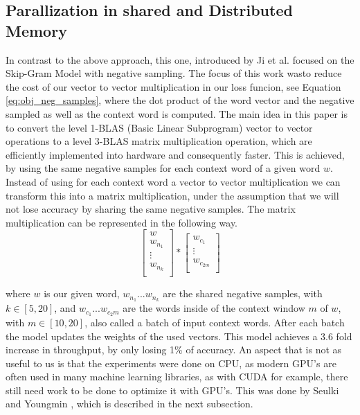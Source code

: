 \subsection{Parallization in shared and Distributed Memory}
In contrast to the above approach, this one, introduced by Ji et al. \cite{intel} focused on the Skip-Gram Model with negative sampling. The focus of this work wasto reduce the cost of our vector to  vector multiplication in our loss funcion, see Equation \ref{eq:obj_neg_samples}, where the dot product of the word vector and the negative sampled as well as the context word is computed.
The main idea in this paper is to convert the level 1-BLAS (Basic Linear Subprogram) vector to vector operations to a level 3-BLAS matrix multiplication operation, which are efficiently implemented into hardware and consequently faster. This is achieved, by using the same negative samples for each context word of a given word $w$. Instead of using for each context word a vector to vector multiplication we can transform this into a matrix multiplication, under the assumption that we will not lose accuracy by sharing the same negative samples. The matrix multiplication can be represented in the following way.
\[
\begin{bmatrix}
w \\
w_{n_1} \\
\vdots \\
w_{n_k}\\
\end{bmatrix}
*
\begin{bmatrix}
w_{c_1}\\
\vdots\\
w_{c_{2m}}\\
\end{bmatrix}
\]

where $w$ is our given word, $w_{n_1}...w_{n_k}$ are the shared negative samples, with $k \in [5,20]$, and $w_{c_1}...w_{c_2m}$ are the words inside of the context window $m$ of $w$, with $m \in [10,20]$, also called a batch of input context words. After each batch the model updates the weights of the used vectors.
This model achieves a 3.6 fold increase in throughput, by only losing 1\% of accuracy. An aspect that is not as useful to us is that the experiments were done on CPU, as modern GPU's are often used in many machine learning libraries, as with CUDA for example, there still need work to be done to optimize it with GPU's. This was done by Seulki and Youngmin \cite{gpu}, which is described in the next subsection.

